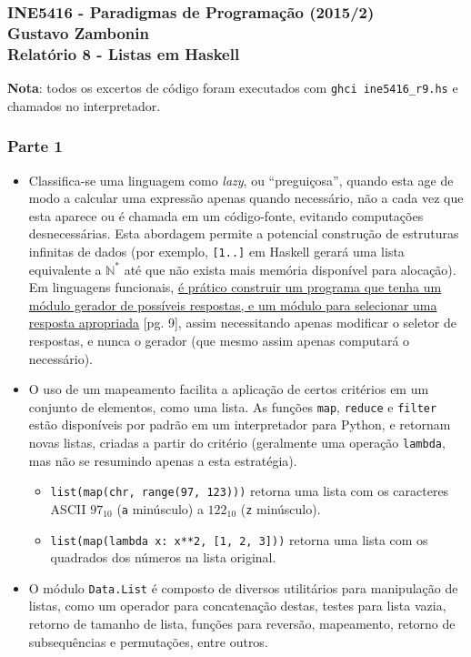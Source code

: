 \documentclass{article}
\begin{document}
\subsubsection*{INE5416 - Paradigmas de Programação (2015/2) \\
    Gustavo Zambonin \\
    Relatório 8 - Listas em Haskell
}

\textbf{Nota}: todos os excertos de código foram executados com
\texttt{ghci ine5416\_r9.hs} e chamados no interpretador.

\subsubsection*{Parte 1}
\begin{itemize}
    \item Classifica-se uma linguagem como \textit{lazy}, ou ``preguiçosa'',
    quando esta age de modo a calcular uma expressão apenas quando necessário,
    não a cada vez que esta aparece ou é chamada em um código-fonte, evitando
    computações desnecessárias. Esta abordagem permite a potencial construção
    de estruturas infinitas de dados (por exemplo, \texttt{[1..]} em Haskell
    gerará uma lista equivalente a $\mathbb{N^{*}}$ até que não exista mais
    memória disponível para alocação). Em linguagens funcionais,
    \href{http://www.cs.kent.ac.uk/people/staff/dat/miranda/whyfp90.pdf}
    {é prático construir um programa que tenha um módulo gerador de possíveis
    respostas, e um módulo para selecionar uma resposta apropriada} [pg. 9],
    assim necessitando apenas modificar o seletor de respostas, e nunca o
    gerador (que mesmo assim apenas computará o necessário).

    \item O uso de um mapeamento facilita a aplicação de certos critérios em
    um conjunto de elementos, como uma lista. As funções \texttt{map},
    \texttt{reduce} e \texttt{filter} estão disponíveis por padrão em um
    interpretador para Python, e retornam novas listas, criadas a partir do
    critério (geralmente uma operação \texttt{lambda}, mas não se resumindo
    apenas a esta estratégia).

    \begin{itemize}
        \item \texttt{list(map(chr, range(97, 123)))} retorna uma lista com os
        caracteres ASCII $97_{10}$ (\texttt{a} minúsculo) a $122_{10}$
        (\texttt{z} minúsculo).

        \item \texttt{list(map(lambda x: x**2, [1, 2, 3]))} retorna uma lista
        com os quadrados dos números na lista original.
    \end{itemize}

    \item O módulo \texttt{Data.List} é composto de diversos utilitários para
    manipulação de listas, como um operador para concatenação destas, testes
    para lista vazia, retorno de tamanho de lista, funções para reversão,
    mapeamento, retorno de subsequências e permutações, entre outros.

\end{itemize}
\end{document}
